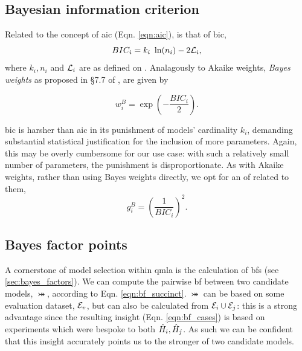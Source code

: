 \par 

\subsection{Bayesian information criterion}\label{sec:bayes_info_criterion}
Related to the concept of \gls{aic} (Eqn. \ref{eqn:aic}), is that of \gls{bic}, 
\begin{equation}
    \label{eqn:bic}
    BIC_i = k_i \ \ln(n_i) - 2 {\mathcal{L}}_{i},
\end{equation}
    where $k_i, n_i$ and ${\mathcal{L}}_i$ are as defined on .
Analagously to Akaike weights, 
    \emph{Bayes weights} as proposed in \S7.7 of \cite{friedman2001elements}, are given by

\begin{equation}
    w_i^B = \exp\left( - \frac{BIC_i}{2}  \right).
\end{equation}

\gls{bic} is harsher than \gls{aic} in its punishment of models' cardinality $k_i$, 
    demanding substantial statistical justification for the inclusion of more parameters. 
Again, this may be overly cumbersome for our use case:
    with such a relatively small number of parameters, 
    the punishment is disproportionate.
As with Akaike weights, rather than using Bayes weights directly, 
    we opt for an \gls{of} related to them, 
\begin{equation}
    \label{eqn:bic_fitness}
    g_i^B = \left( \frac{1}{BIC_i}\right)^2.
\end{equation}
    

\subsection{Bayes factor points}\label{sec:bf_points}
A cornerstone of model selection within \gls{qmla} is the calculation of \glspl{bf} (see \cref{sec:bayes_factors}). 
We can compute the pairwise \gls{bf} between two candidate models, $\bij$, according to Eqn. \ref{eqn:bf_succinct}.
$\bij$ can be based on some evaluation dataset, ${ \mathcal{E} }_v$, but can also be calculated from ${ \mathcal{E} }_i \cup { \mathcal{E} }_j$: 
    this is a strong advantage since the resulting insight (Eqn. \ref{eqn:bf_cases}) is based on 
    \glspl{experiment} which were bespoke to both $\hat{H}_i, \hat{H}_j$. 
As such we can be confident that this insight accurately points us to the stronger of two candidate models. 
\par 

